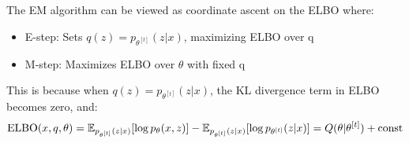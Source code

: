   \begin{corollary}
    The EM algorithm can be viewed as coordinate ascent on the ELBO where:
    \begin{itemize}
      \item E-step: Sets $q(z) = p_{\theta^{[t]}}(z|x)$, maximizing ELBO over q
      \item M-step: Maximizes ELBO over $\theta$ with fixed q
    \end{itemize}
    This is because when $q(z) = p_{\theta^{[t]}}(z|x)$, the KL divergence term in ELBO becomes zero, and:
    \begin{equation}
      \elbo(x, q, \theta) = \mathbb{E}_{p_{\theta^{[t]}}(z|x)}[\log p_\theta(x,z)] - \mathbb{E}_{p_{\theta^{[t]}}(z|x)}[\log p_{\theta^{[t]}}(z|x)] = Q(\theta|\theta^{[t]}) + \text{const}
    \end{equation}
  \end{corollary}

